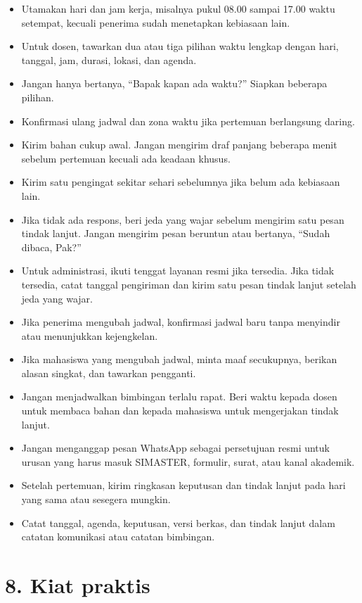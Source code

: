 \documentclass[
  indonesian,
]{article}
\providecommand{\tightlist}{%
  \setlength{\itemsep}{0pt}\setlength{\parskip}{0pt}}
\begin{document}
\begin{itemize}
\tightlist
\item
  Utamakan hari dan jam kerja, misalnya pukul 08.00 sampai 17.00 waktu
  setempat, kecuali penerima sudah menetapkan kebiasaan lain.
\item
  Untuk dosen, tawarkan dua atau tiga pilihan waktu lengkap dengan hari,
  tanggal, jam, durasi, lokasi, dan agenda.
\item
  Jangan hanya bertanya, ``Bapak kapan ada waktu?'' Siapkan beberapa
  pilihan.
\item
  Konfirmasi ulang jadwal dan zona waktu jika pertemuan berlangsung
  daring.
\item
  Kirim bahan cukup awal. Jangan mengirim draf panjang beberapa menit
  sebelum pertemuan kecuali ada keadaan khusus.
\item
  Kirim satu pengingat sekitar sehari sebelumnya jika belum ada
  kebiasaan lain.
\item
  Jika tidak ada respons, beri jeda yang wajar sebelum mengirim satu
  pesan tindak lanjut. Jangan mengirim pesan beruntun atau bertanya,
  ``Sudah dibaca, Pak?''
\item
  Untuk administrasi, ikuti tenggat layanan resmi jika tersedia. Jika
  tidak tersedia, catat tanggal pengiriman dan kirim satu pesan tindak
  lanjut setelah jeda yang wajar.
\item
  Jika penerima mengubah jadwal, konfirmasi jadwal baru tanpa menyindir
  atau menunjukkan kejengkelan.
\item
  Jika mahasiswa yang mengubah jadwal, minta maaf secukupnya, berikan
  alasan singkat, dan tawarkan pengganti.
\item
  Jangan menjadwalkan bimbingan terlalu rapat. Beri waktu kepada dosen
  untuk membaca bahan dan kepada mahasiswa untuk mengerjakan tindak
  lanjut.
\item
  Jangan menganggap pesan WhatsApp sebagai persetujuan resmi untuk
  urusan yang harus masuk SIMASTER, formulir, surat, atau kanal
  akademik.
\item
  Setelah pertemuan, kirim ringkasan keputusan dan tindak lanjut pada
  hari yang sama atau sesegera mungkin.
\item
  Catat tanggal, agenda, keputusan, versi berkas, dan tindak lanjut
  dalam catatan komunikasi atau catatan bimbingan.
\end{itemize}

\section{8. Kiat praktis}\label{kiat-praktis}
\end{document}
